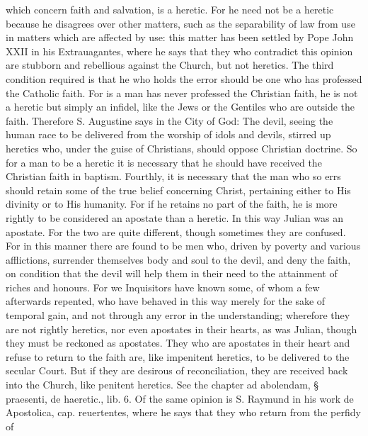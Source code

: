        which concern faith and salvation, is a heretic. For he need not be a heretic because he
       disagrees over other matters, such as the separability of law from use in matters which are
       affected by use: this matter has been settled by Pope John XXII in his Extrauagantes, where
       he says that they who contradict this opinion are stubborn and rebellious against the Church,
       but not heretics.
             The third condition required is that he who holds the error should be one who has
       professed the Catholic faith. For is a man has never professed the Christian faith, he is not a
       heretic but simply an infidel, like the Jews or the Gentiles who are outside the faith.
       Therefore S. Augustine says in the City of God: The devil, seeing the human race to be
       delivered from the worship of idols and devils, stirred up heretics who, under the guise of
       Christians, should oppose Christian doctrine. So for a man to be a heretic it is necessary that
       he should have received the Christian faith in baptism.
             Fourthly, it is necessary that the man who so errs should retain some of the true belief
       concerning Christ, pertaining either to His divinity or to His humanity. For if he retains no
       part of the faith, he is more rightly to be considered an apostate than a heretic. In this way
       Julian was an apostate. For the two are quite different, though sometimes they are confused.
       For in this manner there are found to be men who, driven by poverty and various afflictions,
       surrender themselves body and soul to the devil, and deny the faith, on condition that the
       devil will help them in their need to the attainment of riches and honours.
             For we Inquisitors have known some, of whom a few afterwards repented, who have
       behaved in this way merely for the sake of temporal gain, and not through any error in the
       understanding; wherefore they are not rightly heretics, nor even apostates in their hearts, as
       was Julian, though they must be reckoned as apostates.
             They who are apostates in their heart and refuse to return to the faith are, like
       impenitent heretics, to be delivered to the secular Court. But if they are desirous of
       reconciliation, they are received back into the Church, like penitent heretics. See the chapter
       ad abolendam, § praesenti, de haeretic., lib. 6. Of the same opinion is S. Raymund in his
       work de Apostolica, cap. reuertentes, where he says that they who return from the perfidy of
